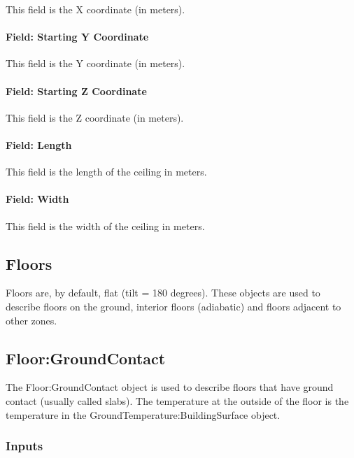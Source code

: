 This field is the X coordinate (in meters).

\paragraph{Field: Starting Y Coordinate}\label{field-starting-y-coordinate-6}

This field is the Y coordinate (in meters).

\paragraph{Field: Starting Z Coordinate}\label{field-starting-z-coordinate-6}

This field is the Z coordinate (in meters).

\paragraph{Field: Length}\label{field-length-6}

This field is the length of the ceiling in meters.

\paragraph{Field: Width}\label{field-width-2}

This field is the width of the ceiling in meters.

\subsection{Floors}\label{floors}

Floors are, by default, flat (tilt = 180 degrees). These objects are used to describe floors on the ground, interior floors (adiabatic) and floors adjacent to other zones.

\subsection{Floor:GroundContact}\label{floorgroundcontact}

The Floor:GroundContact object is used to describe floors that have ground contact (usually called slabs). The temperature at the outside of the floor is the temperature in the GroundTemperature:BuildingSurface object.

\subsubsection{Inputs}\label{inputs-11-021}


